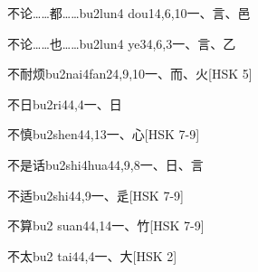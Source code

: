 \begin{EntryWithPhonetic}{不论……都……}{bu2lun4 dou1}{4,6,10}{⼀、⾔、⾢}
\end{EntryWithPhonetic}

\begin{EntryWithPhonetic}{不论……也……}{bu2lun4 ye3}{4,6,3}{⼀、⾔、⼄}
\end{EntryWithPhonetic}

\begin{EntryWithPhonetic}{不耐烦}{bu2nai4fan2}{4,9,10}{⼀、⽽、⽕}[HSK 5]
\end{EntryWithPhonetic}

\begin{EntryWithPhonetic}{不日}{bu2ri4}{4,4}{⼀、⽇}
\end{EntryWithPhonetic}

\begin{EntryWithPhonetic}{不慎}{bu2shen4}{4,13}{⼀、⼼}[HSK 7-9]
\end{EntryWithPhonetic}

\begin{EntryWithPhonetic}{不是话}{bu2shi4hua4}{4,9,8}{⼀、⽇、⾔}
\end{EntryWithPhonetic}

\begin{EntryWithPhonetic}{不适}{bu2shi4}{4,9}{⼀、⾡}[HSK 7-9]
\end{EntryWithPhonetic}

\begin{EntryWithPhonetic}{不算}{bu2 suan4}{4,14}{⼀、⽵}[HSK 7-9]
\end{EntryWithPhonetic}

\begin{EntryWithPhonetic}{不太}{bu2 tai4}{4,4}{⼀、⼤}[HSK 2]
\end{EntryWithPhonetic}

